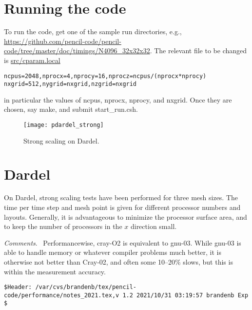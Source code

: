 \documentclass[twocolumn]{article}
\begin{document}
\section{Running the code}

To run the code, get one of the sample run directories, e.g.,
\url{https://github.com/pencil-code/pencil-code/tree/master/doc/timings/N4096_32x32x32}.
The relevant file to be changed is \url{src/cparam.local}
\scriptsize
\begin{verbatim}
ncpus=2048,nprocx=4,nprocy=16,nprocz=ncpus/(nprocx*nprocy)
nxgrid=512,nygrid=nxgrid,nzgrid=nxgrid
\end{verbatim}
\normalsize
in particular the values of ncpus, nprocx, nprocy, and nxgrid.
Once they are chosen, say make, and submit
start\_run.csh.

\begin{figure}[b!]\begin{center}
\texttt{[image: pdardel\_strong]}
\end{center}\caption[]{
Strong scaling on Dardel.
}\label{pdardel_strong}\end{figure}

\section{Dardel}

On Dardel, strong scaling tests have been performed
for three mesh sizes.
The time per time step and mesh point is given for
different processor numbers and layouts.
Generally, it is advantageous to minimize the
processor surface area, and to keep the number
of processors in the $x$ direction small.

{\em Comments}.~
Performancewise, cray-O2 is equivalent to gnu-03.
While gnu-03 is able to handle memory or whatever compiler problems much
better, it is otherwise not better than Cray-02, and often some 10--20\%
slows, but this is within the measurement accuracy.




\vfill\bigskip\noindent\tiny\begin{verbatim}
$Header: /var/cvs/brandenb/tex/pencil-code/performance/notes_2021.tex,v 1.2 2021/10/31 03:19:57 brandenb Exp $
\end{verbatim}
\end{document}

